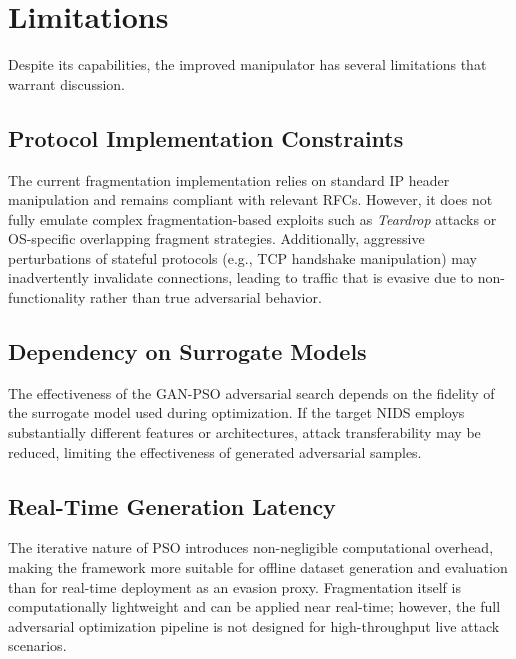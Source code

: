 \section{Limitations}

Despite its capabilities, the improved manipulator has several limitations that warrant discussion.

\subsection*{Protocol Implementation Constraints}

The current fragmentation implementation relies on standard IP header manipulation and remains compliant with relevant RFCs. However, it does not fully emulate complex fragmentation-based exploits such as \textit{Teardrop} attacks or OS-specific overlapping fragment strategies. Additionally, aggressive perturbations of stateful protocols (e.g., TCP handshake manipulation) may inadvertently invalidate connections, leading to traffic that is evasive due to non-functionality rather than true adversarial behavior.

\subsection*{Dependency on Surrogate Models}

The effectiveness of the GAN-PSO adversarial search depends on the fidelity of the surrogate model used during optimization. If the target NIDS employs substantially different features or architectures, attack transferability may be reduced, limiting the effectiveness of generated adversarial samples.

\subsection*{Real-Time Generation Latency}

The iterative nature of PSO introduces non-negligible computational overhead, making the framework more suitable for offline dataset generation and evaluation than for real-time deployment as an evasion proxy. Fragmentation itself is computationally lightweight and can be applied near real-time; however, the full adversarial optimization pipeline is not designed for high-throughput live attack scenarios.


